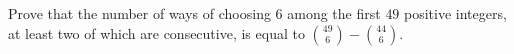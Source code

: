 Prove that the number of ways of choosing $6$ among the first $49$ positive integers, at least two of which are consecutive, is equal to $\binom{49}6-\binom{44}6$.